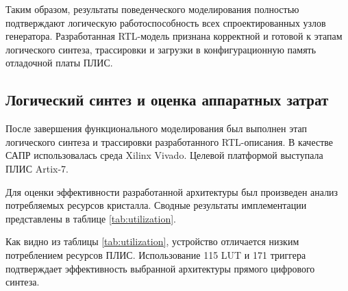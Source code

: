 \documentclass[12pt,a4paper,TimesNewRoman]{article}
\begin{document}
Таким образом, результаты поведенческого моделирования полностью подтверждают логическую работоспособность всех спроектированных узлов генератора. Разработанная RTL-модель признана корректной и готовой к этапам логического синтеза, трассировки и загрузки в конфигурационную память отладочной платы ПЛИС.


\subsection{Логический синтез и оценка аппаратных затрат}
После завершения функционального моделирования был выполнен этап логического синтеза и трассировки разработанного RTL-описания. В качестве САПР использовалась среда Xilinx Vivado. Целевой платформой выступала ПЛИС Artix-7.

Для оценки эффективности разработанной архитектуры был произведен анализ потребляемых ресурсов кристалла. Сводные результаты имплементации представлены в таблице \ref{tab:utilization}.


\begin{table}[htpb]
    \centering
    \caption{Утилизация ресурсов ПЛИС Artix-7}
    \label{tab:utilization}
\end{table}

Как видно из таблицы \ref{tab:utilization}, устройство отличается низким потреблением ресурсов ПЛИС. Использование 115 LUT и 171 триггера подтверждает эффективность выбранной архитектуры прямого цифрового синтеза.
\end{document}
